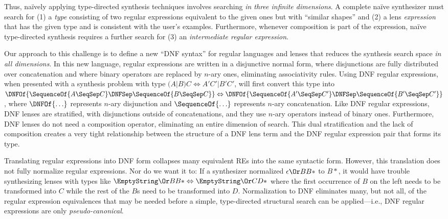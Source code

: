 \documentclass[acmsmall,screen]{acmart}
\begin{document}

Thus, na\"{i}vely applying type-directed synthesis techniques
involves searching \emph{in three infinite dimensions}.  A complete na\"{i}ve
synthesizer must search for
(1) a \emph{type} consisting of two regular expressions equivalent to the
given ones but with ``similar shapes'' and
(2) a lens \emph{expression} that has the given type and is consistent
with the user's examples.
Furthermore, whenever composition is part of the
expression, na\"{i}ve type-directed synthesis requires a further search for
(3) an {\em intermediate regular expression}.

Our approach to this challenge is to define a new ``DNF syntax'' for regular
languages
and lenses that reduces the synthesis search space \emph{in all dimensions}.
In this new language, regular expressions are written in a disjunctive normal
form, where disjunctions are fully distributed over concatenation and where binary
operators are replaced by $n$-ary ones, eliminating associativity rules.
Using DNF regular expressions, when presented with a synthesis problem with type
$(A | B) C \Leftrightarrow A' C' | B' C'$, \Optician{} will first convert this
type into $\DNFOf{\SequenceOf{A \SeqSep C} \DNFSep \SequenceOf{B
    \SeqSep C}} \Leftrightarrow
\DNFOf{\SequenceOf{A' \SeqSep C'} \DNFSep \SequenceOf{B' \SeqSep C'}}$, where
$\DNFOf{\ldots}$ represents $n$-ary disjunction and $\SequenceOf{\ldots}$
represents $n$-ary concatenation.
Like DNF regular expressions, DNF lenses are stratified, with disjunctions
outside of concatenations, and they use $n$-ary operators instead of binary
ones.  Furthermore, DNF lenses do not need a composition operator, eliminating
an entire dimension of search.  This dual stratification and the lack of
composition creates a very tight relationship between the structure of a
DNF lens term and the DNF regular expression pair that forms its type.

Translating regular expressions into DNF form collapses many equivalent REs
into the same syntactic form.  However, this translation does not fully
normalize regular expressions.
Nor do we want it to: If a synthesizer normalized $\epsilon \Or BB*$ to $B*$, it
would have trouble synthesizing lenses with types like $\EmptyString \Or BB*
\Leftrightarrow \EmptyString \Or CD*$
where the first occurrence of $B$ on the left needs to be transformed into
$C$ while the rest of the $B$s need to be transformed into $D$.
Normalization to DNF eliminates many, but not all, of the regular expression
equivalences that may be needed before a simple, type-directed structural search
can be applied---i.e., DNF regular expressions are only
\emph{pseudo-canonical}.
\end{document}

